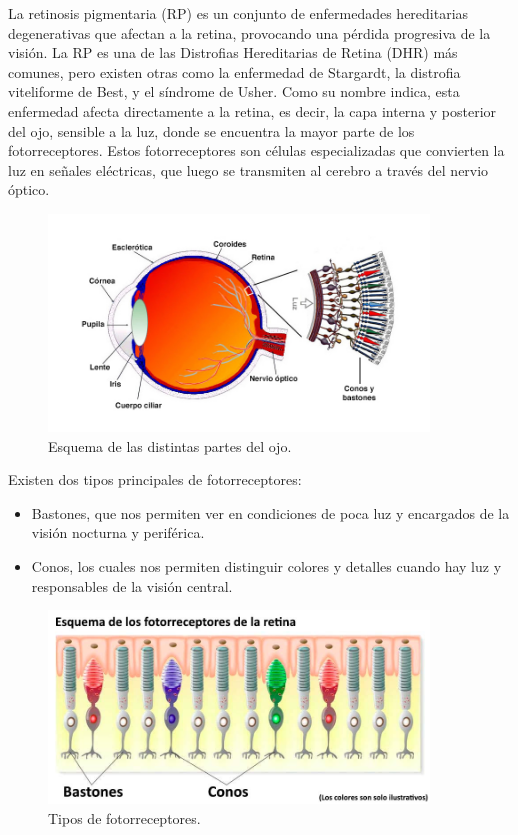 \documentclass[11pt,spanish,listoffigures,listoftables]{tfgetsinf}
\begin{document}
La retinosis pigmentaria (\ac{RP}) es un conjunto de enfermedades hereditarias degenerativas que afectan a la retina, provocando una pérdida progresiva de la visión. La \ac{RP} es una de las Distrofias Hereditarias de Retina (\ac{DHR}) más comunes, pero existen otras como la enfermedad de Stargardt, la distrofia viteliforme de Best, y el síndrome de Usher. Como su nombre indica, esta enfermedad afecta directamente a la retina, es decir, la capa interna y posterior del ojo, sensible a la luz, donde se encuentra la mayor parte de los fotorreceptores. Estos fotorreceptores son células especializadas que convierten la luz en señales eléctricas, que luego se transmiten al cerebro a través del nervio óptico\cite{GAR}.

\begin{figure}[H]
   \centering
   \includegraphics[width=0.9\textwidth]{retina.jpg}
   \caption{Esquema de las distintas partes del ojo.}
   \label{fig:etiqueta_opcional21}
\end{figure}

Existen dos tipos principales de fotorreceptores: 

\begin{itemize}
\item Bastones, que nos permiten ver en condiciones de poca luz y encargados de la visión nocturna y periférica. 
\item Conos, los cuales nos permiten distinguir colores y detalles cuando hay luz y responsables de la visión central. 
\end{itemize}

\begin{figure}[H]
   \centering
   \includegraphics[width=0.9\textwidth]{fotorreceptores.jpg}
   \caption{Tipos de fotorreceptores.}
   \label{fig:etiqueta_opcional22}
\end{figure}
\end{document}
